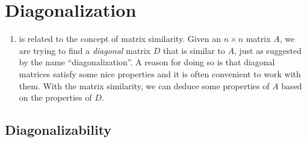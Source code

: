 \section{Diagonalization}
\label{sect:diagonalization}
\begin{enumerate}
\item {} is related to the concept of matrix
similarity. Given an \(n\times n\) matrix \(A\), we are trying to find a
\emph{diagonal} matrix \(D\) that is similar to \(A\), just as suggested by the
name ``diagonalization''. A reason for doing so is that diagonal matrices
satisfy some nice properties and it is often convenient to work with them. With
the matrix similarity, we can deduce some properties of \(A\) based on the
properties of \(D\).
\end{enumerate}
\subsection{Diagonalizability}
